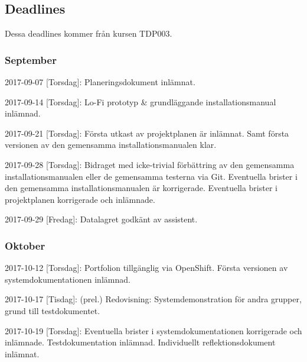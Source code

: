 \documentclass{TDP003mall}
\begin{document}
\subsection{Deadlines}
  Dessa deadlines kommer från kursen TDP003.
\subsubsection{September}
  2017-09-07 [Torsdag]:   Planeringsdokument inlämnat.

  2017-09-14 [Torsdag]:   Lo-Fi prototyp \& grundläggande installationsmanual inlämnad.

  2017-09-21 [Torsdag]:   Första utkast av projektplanen är inlämnat. Samt första versionen av den gemensamma installationsmanualen klar.

  2017-09-28 [Torsdag]:   Bidraget med icke-trivial förbättring av den gemensamma installationsmanualen eller de gemensamma testerna via Git. Eventuella brister i den gemensamma installationsmanualen är korrigerade. Eventuella brister i projektplanen korrigerade och inlämnade.

  2017-09-29  [Fredag]:   Datalagret godkänt av assistent.

\subsubsection{Oktober}
  2017-10-12  [Torsdag]:   Portfolion tillgänglig via OpenShift. Första versionen av systemdokumentationen inlämnad.

  2017-10-17  [Tisdag]:   (prel.) Redovisning: Systemdemonstration för andra grupper, grund till testdokumentet.

  2017-10-19 [Torsdag]:   Eventuella brister i systemdokumentationen korrigerade och inlämnade. Testdokumentation inlämnad. Individuellt reflektionsdokument inlämnat.
\end{document}
